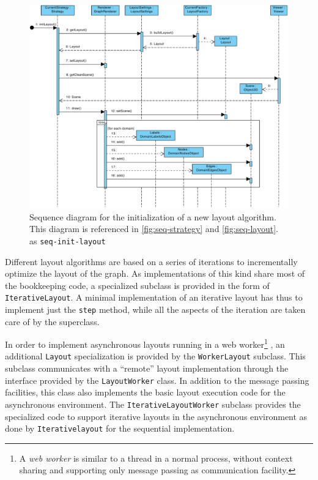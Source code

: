\begin{figure}
  \begin{adjustwidth}{-18mm}{-6.2mm}  
    \includegraphics[width=\linewidth]{images/diagrams/seq-init-layout}
  \end{adjustwidth}
  \caption[Sequence diagram for the initialization of a new layout algorithm.]{Sequence diagram for the initialization of a new layout algorithm. This diagram is referenced in \ref{fig:seq-strategy} and \ref{fig:seq-layout}. as \texttt{seq-init-layout}}
  \label{fig:seq-init-layout}
\end{figure}

Different layout algorithms are based on a series of iterations to incrementally optimize the layout of the graph. As implementations of this kind share most of the bookkeeping code, a specialized subclass is provided in the form of \texttt{IterativeLayout}. A minimal implementation of an iterative layout has thus to implement just the \texttt{step} method, while all the aspects of the iteration are taken care of by the superclass.

In order to implement asynchronous layouts running in a web worker\footnote{A \emph{web worker} is similar to a thread in a normal process, without context sharing and supporting only message passing as communication facility.} \cite{webworker}, an additional \texttt{Layout} specialization is provided by the \texttt{WorkerLayout} subclass. This subclass communicates with a ``remote'' layout implementation through the interface provided by the \texttt{LayoutWorker} class. In addition to the message passing facilities, this class also implements the basic layout execution code for the asynchronous environment. The \texttt{IterativeLayoutWorker} subclass provides the specialized code to support iterative layouts in the asynchronous environment as done by \texttt{Iterativelayout} for the sequential implementation.

